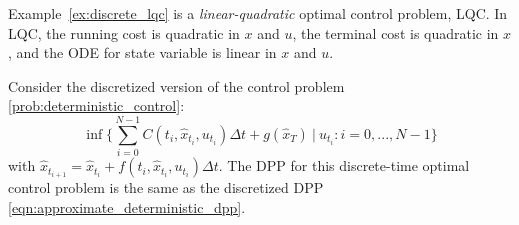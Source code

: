\documentclass[11pt]{book}
\begin{document}
Example~\eqref{ex:discrete_lqc} is a \emph{linear-quadratic} optimal control problem, LQC. In LQC, the running cost is quadratic in $x$ and $u$, the terminal cost is quadratic in $x$, and the ODE for state variable is linear in $x$ and $u$.

\begin{rem}
Consider the discretized version of the control problem \eqref{prob:deterministic_control}:
\begin{equation}
    \label{prob:discrete_deterministic_control}
    \inf\Big\{\sum_{i=0}^{N-1}C(t_i,\hat{x}_{t_i},u_{t_i}){{\Delta t}}+g(\hat{x}_{T})~|~{u_{t_i}:i=0,...,N-1}\Big\}
\end{equation}
with $\hat{x}_{t_{i+1}} = \hat{x}_{t_i} + f(t_i,\hat{x}_{t_i},u_{t_i}){\Delta t}$. The DPP for this discrete-time optimal control problem is the same as the discretized DPP \eqref{eqn:approximate_deterministic_dpp}.
\end{rem}
\end{document}

